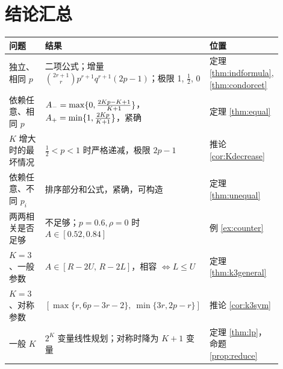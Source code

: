 \documentclass[11pt]{article}
\begin{document}
\section{结论汇总}

\begin{center}
\small
\renewcommand{\arraystretch}{1.3}
\begin{tabular}{>{\raggedright\arraybackslash}p{0.30\linewidth}>{\raggedright\arraybackslash}p{0.44\linewidth}>{\raggedright\arraybackslash}p{0.16\linewidth}}
\toprule
问题 & 结果 & 位置\\
\midrule
独立、相同 $p$ & 二项公式；增量 $\binom{2r+1}{r}p^{r+1}q^{r+1}(2p-1)$；极限 1, $\frac12$, 0 & 定理 \ref{thm:indformula}, \ref{thm:condorcet}\\
依赖任意、相同 $p$ & $A_{-}=\max\{0,\frac{2Kp-K+1}{K+1}\}$，$A_{+}=\min\{1,\frac{2Kp}{K+1}\}$，紧确 & 定理 \ref{thm:equal}\\
$K$ 增大时的最坏情况 & $\frac12<p<1$ 时严格递减，极限 $2p-1$ & 推论 \ref{cor:Kdecrease}\\
依赖任意、不同 $p_i$ & 排序部分和公式，紧确，可构造 & 定理 \ref{thm:unequal}\\
两两相关是否足够 & 不足够；$p=0.6,\rho=0$ 时 $A\in[0.52,0.84]$ & 例 \ref{ex:counter}\\
$K=3$、一般参数 & $A\in[R-2U,\,R-2L]$，相容 $\iff L\le U$ & 定理 \ref{thm:k3general}\\
$K=3$、对称参数 & $[\max\{r,6p-3r-2\},\ \min\{3r,2p-r\}]$ & 推论 \ref{cor:k3sym}\\
一般 $K$ & $2^K$ 变量线性规划；对称时降为 $K+1$ 变量 & 定理 \ref{thm:lp}，命题 \ref{prop:reduce}\\
\bottomrule
\end{tabular}
\end{center}
\end{document}
